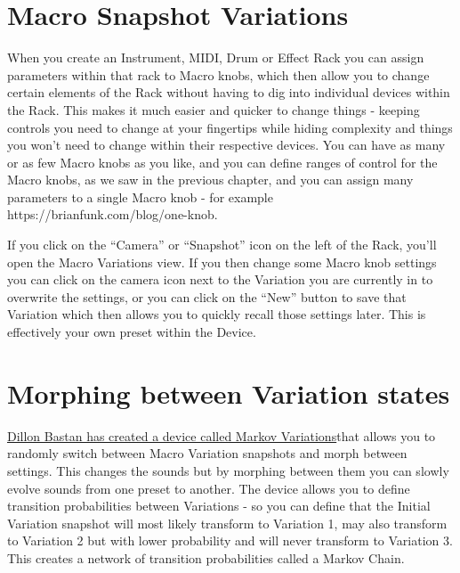 \documentclass[
  12pt,
  letterpaper,
  oneside,
  open=any]{scrbook}
\makeatletter
\newcommand*\pandocbounded[1]{%
  \sbox\pandoc@box{#1}%
  \Gscale@div\@tempa{\textheight}{\dimexpr\ht\pandoc@box+\dp\pandoc@box\relax}%
  \Gscale@div\@tempb{\linewidth}{\wd\pandoc@box}%
  \ifdim\@tempb\p@<\@tempa\p@\let\@tempa\@tempb\fi%
  \ifdim\@tempa\p@<\p@\scalebox{\@tempa}{\usebox\pandoc@box}%
  \else\usebox{\pandoc@box}%
  \fi%
}
\makeatother
\begin{document}
\section{Macro Snapshot Variations}\label{macro-snapshot-variations}

When you create an Instrument, MIDI, Drum or Effect Rack you can assign
parameters within that rack to Macro knobs, which then allow you to
change certain elements of the Rack without having to dig into
individual devices within the Rack. This makes it much easier and
quicker to change things - keeping controls you need to change at your
fingertips while hiding complexity and things you won't need to change
within their respective devices. You can have as many or as few Macro
knobs as you like, and you can define ranges of control for the Macro
knobs, as we saw in the previous chapter, and you can assign many
parameters to a single Macro knob - for example
https://brianfunk.com/blog/one-knob.

If you click on the ``Camera'' or ``Snapshot'' icon on the left of the
Rack, you'll open the Macro Variations view. If you then change some
Macro knob settings you can click on the camera icon next to the
Variation you are currently in to overwrite the settings, or you can
click on the ``New'' button to save that Variation which then allows you
to quickly recall those settings later. This is effectively your own
preset within the Device.

\pandocbounded{\texttt{[image: images/Macro\_Variations.png]}}

\section{Morphing between Variation
states}\label{morphing-between-variation-states}

\href{https://dillonbastan.com/store/maxforlive/index.php?product=markov-variations}{Dillon
Bastan has created a device called Markov Variations}that allows you to
randomly switch between Macro Variation snapshots and morph between
settings. This changes the sounds but by morphing between them you can
slowly evolve sounds from one preset to another. The device allows you
to define transition probabilities between Variations - so you can
define that the Initial Variation snapshot will most likely transform to
Variation 1, may also transform to Variation 2 but with lower
probability and will never transform to Variation 3. This creates a
network of transition probabilities called a Markov Chain.\\
\end{document}
